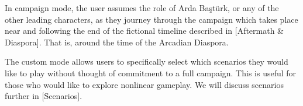 In campaign mode, the user assumes the role of Arda Baştürk, or any of the other leading characters, as they journey through the campaign which takes place near and following the end of the fictional timeline described in [Aftermath & Diaspora]. That is, around the time of the Arcadian Diaspora.



The custom mode allows users to specifically select which scenarios they would like to play without thought of commitment to a full campaign. This is useful for those who would like to explore nonlinear gameplay. We will discuss scenarios further in [Scenarios].
